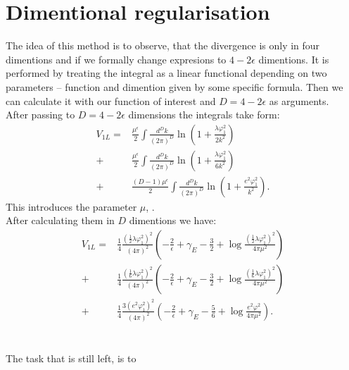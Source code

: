 \section{Dimentional regularisation}
The idea of this method is to observe, that the divergence is only in four dimentions 
and if we formally change expresions to $4-2\epsilon$ dimentions. 
It is performed by treating the integral as a linear functional depending on two parameters --
function and dimention given by some specific formula. Then we can calculate it with our 
function of interest and $D = 4-2\epsilon$ as arguments.  \\
After passing to $D=4-2\epsilon$ dimensions the integrals take form: 
\begin{align}
V_{1L}=&\frac{\mu^\epsilon}{2} \int\frac{d^Dk}{(2\pi)^D}\ln{\left(1+\frac{\lambda\varphi_1^2}{2k^2}
\right)}\\
+&\frac{\mu^\epsilon}{2} \int\frac{d^Dk}{(2\pi)^D}\ln{\left(1+\frac{\lambda\varphi_1^2}{6k^2}
\right)} \\ 
+&\frac{(D-1)\mu^\epsilon}{2} \int\frac{d^Dk}{(2\pi)^D}\ln{\left(1+\frac{e^2\varphi_1^2}{k^2}\right)}.
\end{align}
This introduces the parameter $\mu$, . \\
After calculating them in $D$ dimentions we have:
\begin{align}
V_{1L}=&\frac{1}{4}\frac{(\frac{1}{2}\lambda\varphi_1^2)^2}{(4\pi)^2}\left(-\frac{2}{\epsilon}
+\gamma_E-\frac{3}{2}+\log{\frac{(\frac{1}{2}\lambda\varphi_1^2)^2}{4\pi\mu^2}}\right)  \\
+&\frac{1}{4}\frac{(\frac{1}{6}\lambda\varphi_1^2)^2}{(4\pi)^2}\left(-\frac{2}{\epsilon}
+\gamma_E-\frac{3}{2}+\log{\frac{(\frac{1}{6}\lambda\varphi_1^2)^2}{4\pi\mu^2}}\right)  \\
+&\frac{1}{4}\frac{3(e^2\varphi_1^2)^2}{(4\pi)^2}\left(-\frac{2}{\epsilon}+\gamma_E
-\frac{5}{6}+\log{\frac{e^2\varphi^2}{4\pi\mu^2}}\right).
\end{align}
\section{}
The task that is still left, is to 


















